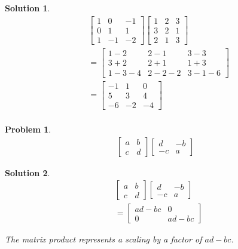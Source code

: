 \documentclass{article}
\newtheorem{problem}{Problem}
\newtheorem*{solution}{Solution}
\begin{document}
\begin{solution}
\begin{align*}
& \begin{bmatrix}
1 & 0 & -1 \\ 0 & 1 & 1 \\ 1 & -1 & -2
\end{bmatrix}
\begin{bmatrix}
1 & 2 & 3 \\ 3 & 2 & 1 \\ 2 & 1 & 3 
\end{bmatrix} \\
&= \begin{bmatrix}
1-2 & 2-1 & 3-3 \\ 3+2 & 2+1 & 1+3 \\ 1-3-4 & 2-2-2 & 3-1-6 
\end{bmatrix} \\
&= \begin{bmatrix}
-1 & 1 & 0 \\ 5 & 3 & 4 \\ -6 & -2 & -4 
\end{bmatrix} \\
\end{align*}
\end{solution}

\begin{problem}
\begin{align*}
\begin{bmatrix}
a & b \\ c & d 
\end{bmatrix} 
\begin{bmatrix}
d & -b \\ -c & a
\end{bmatrix} 
\end{align*}
\end{problem}

\begin{solution}
\begin{align*}
& \begin{bmatrix}
a & b \\ c & d 
\end{bmatrix} 
\begin{bmatrix}
d & -b \\ -c & a
\end{bmatrix} \\
&= \begin{bmatrix}
ad - bc & 0 \\ 0 & ad - bc
\end{bmatrix}
\end{align*}

The matrix product represents a scaling by a factor of $ad - bc$.
\end{solution}
\end{document}
